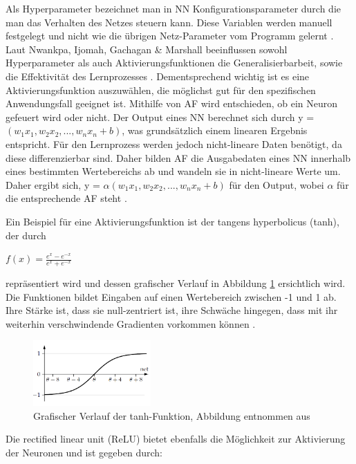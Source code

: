 \documentclass[12pt,a4paper]{article}
\begin{document}
Als Hyperparameter bezeichnet man in NN Konfigurationsparameter durch die man das Verhalten des Netzes steuern kann. Diese Variablen werden manuell festgelegt und nicht wie die übrigen Netz-Parameter vom Programm gelernt \cite[S. 113]{Goodfellow2015}.
Laut Nwankpa, Ijomah, Gachagan \& Marshall beeinflussen sowohl Hyperparameter als auch Aktivierungsfunktionen die Generalisierbarbeit, sowie die Effektivität des Lernprozesses \cite{Nwankpa2018}. Dementsprechend wichtig ist es eine Aktivierungsfunktion auszuwählen, die möglichst gut für den spezifischen Anwendungsfall geeignet ist. Mithilfe von AF wird entschieden, ob ein Neuron gefeuert wird oder nicht. Der Output eines NN berechnet sich durch y = $(w_{1}x_{1}, w_{2}x_{2}, ..., w_{n}x_{n} + b)$, was grundsätzlich einem linearen Ergebnis entspricht. Für den Lernprozess werden jedoch nicht-lineare Daten benötigt, da diese differenzierbar sind. Daher bilden AF die Ausgabedaten eines NN innerhalb eines bestimmten Wertebereichs ab und wandeln sie in nicht-lineare Werte um. Daher ergibt sich, y = $ \alpha (w_{1}x_{1}, w_{2}x_{2}, ..., w_{n}x_{n} + b)$ für den Output, wobei $\alpha $ für die entsprechende AF steht \cite{Nwankpa2018}.

Ein Beispiel für eine Aktivierungsfunktion ist der tangens hyperbolicus (tanh), der durch 

$ f(x) = \frac{e^x - e^{-x}}{e^x + e^{-x}}$ 

repräsentiert wird \cite{Nwankpa2018} und dessen grafischer Verlauf in Abbildung \ref{fig:tanh} ersichtlich wird. Die Funktionen bildet Eingaben auf einen Wertebereich zwischen -1 und 1 ab. Ihre Stärke ist, dass sie null-zentriert ist, ihre Schwäche hingegen, dass mit ihr weiterhin verschwindende Gradienten vorkommen können \cite{Nwankpa2018}.

\begin{figure}
\centering
\includegraphics[width=0.4\textwidth]{pics/tanh.png}	
\caption{Grafischer Verlauf der tanh-Funktion, Abbildung entnommen aus \cite[S. 45]{Kruse2015}}
\label{fig:tanh}
\end{figure}

Die rectified linear unit (ReLU) bietet ebenfalls die Möglichkeit zur Aktivierung der Neuronen und ist gegeben durch:
\end{document}
